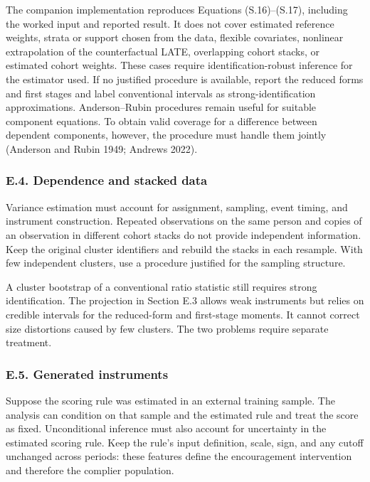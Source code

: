 \documentclass[
  11pt,
]{article}
\begin{document}
The companion implementation reproduces Equations (S.16)--(S.17),
including the worked input and reported result. It does not cover
estimated reference weights, strata or support chosen from the data,
flexible covariates, nonlinear extrapolation of the counterfactual LATE,
overlapping cohort stacks, or estimated cohort weights. These cases
require identification-robust inference for the estimator used. If no
justified procedure is available, report the reduced forms and first
stages and label conventional intervals as strong-identification
approximations. Anderson--Rubin procedures remain useful for suitable
component equations. To obtain valid coverage for a difference between
dependent components, however, the procedure must handle them jointly
(Anderson and Rubin 1949; Andrews 2022).

\hypertarget{e.4.-dependence-and-stacked-data}{%
\subsubsection{E.4. Dependence and stacked
data}\label{e.4.-dependence-and-stacked-data}}

Variance estimation must account for assignment, sampling, event timing,
and instrument construction. Repeated observations on the same person
and copies of an observation in different cohort stacks do not provide
independent information. Keep the original cluster identifiers and
rebuild the stacks in each resample. With few independent clusters, use
a procedure justified for the sampling structure.

A cluster bootstrap of a conventional ratio statistic still requires
strong identification. The projection in Section E.3 allows weak
instruments but relies on credible intervals for the reduced-form and
first-stage moments. It cannot correct size distortions caused by few
clusters. The two problems require separate treatment.

\Needspace{0.22\textheight}

\hypertarget{e.5.-generated-instruments}{%
\subsubsection{E.5. Generated
instruments}\label{e.5.-generated-instruments}}

Suppose the scoring rule was estimated in an external training sample.
The analysis can condition on that sample and the estimated rule and
treat the score as fixed. Unconditional inference must also account for
uncertainty in the estimated scoring rule. Keep the rule's input
definition, scale, sign, and any cutoff unchanged across periods: these
features define the encouragement intervention and therefore the
complier population.
\end{document}
